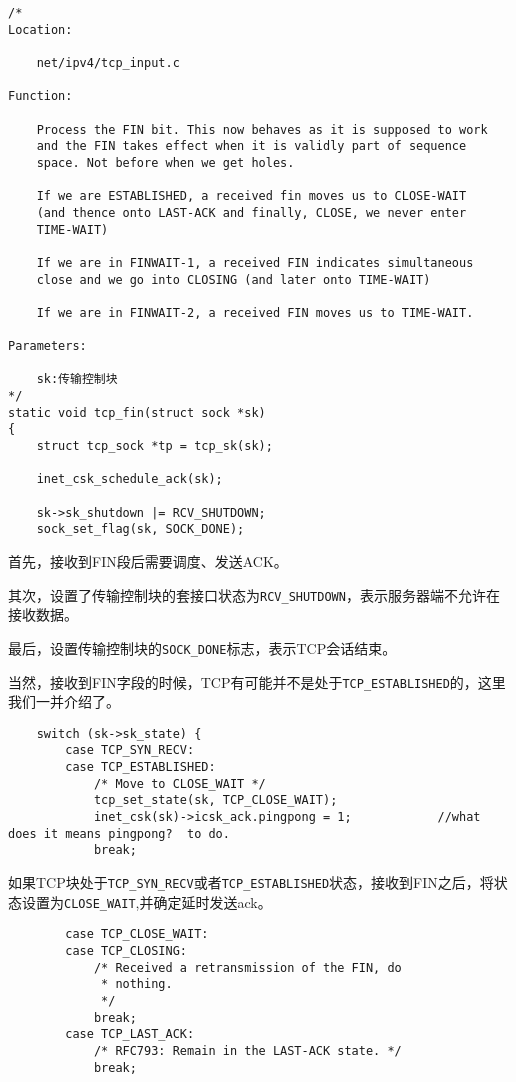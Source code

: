 \begin{verbatim}
/*
Location:

	net/ipv4/tcp_input.c

Function:

  	Process the FIN bit. This now behaves as it is supposed to work
 	and the FIN takes effect when it is validly part of sequence
 	space. Not before when we get holes.
 
 	If we are ESTABLISHED, a received fin moves us to CLOSE-WAIT
 	(and thence onto LAST-ACK and finally, CLOSE, we never enter
 	TIME-WAIT)
 
 	If we are in FINWAIT-1, a received FIN indicates simultaneous
	close and we go into CLOSING (and later onto TIME-WAIT)
 
 	If we are in FINWAIT-2, a received FIN moves us to TIME-WAIT.

Parameters:

	sk:传输控制块
*/
static void tcp_fin(struct sock *sk)
{
	struct tcp_sock *tp = tcp_sk(sk);

	inet_csk_schedule_ack(sk);

	sk->sk_shutdown |= RCV_SHUTDOWN;
	sock_set_flag(sk, SOCK_DONE);
\end{verbatim}

			首先，接收到FIN段后需要调度、发送ACK。

			其次，设置了传输控制块的套接口状态为\texttt{RCV_SHUTDOWN}，表示服务器端不允许在接收数据。
	
			最后，设置传输控制块的\texttt{SOCK_DONE}标志，表示TCP会话结束。

			当然，接收到FIN字段的时候，TCP有可能并不是处于\texttt{TCP_ESTABLISHED}的，这里我们一并介绍了。

\begin{verbatim}
	switch (sk->sk_state) {
		case TCP_SYN_RECV:
		case TCP_ESTABLISHED:
			/* Move to CLOSE_WAIT */
			tcp_set_state(sk, TCP_CLOSE_WAIT);
			inet_csk(sk)->icsk_ack.pingpong = 1;			//what does it means pingpong?  to do.
			break;
\end{verbatim}

			如果TCP块处于\texttt{TCP_SYN_RECV}或者\texttt{TCP_ESTABLISHED}状态，接收到FIN之后，将状态设置为\texttt{CLOSE_WAIT},并确定延时发送ack。
\begin{verbatim}
		case TCP_CLOSE_WAIT:
		case TCP_CLOSING:
			/* Received a retransmission of the FIN, do
			 * nothing.
			 */
			break;
		case TCP_LAST_ACK:
			/* RFC793: Remain in the LAST-ACK state. */
			break;
\end{verbatim}

